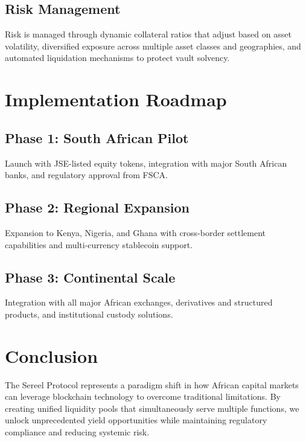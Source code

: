 \documentclass[12pt]{article}
\begin{document}
\subsection{Risk Management}

Risk is managed through dynamic collateral ratios that adjust based on asset volatility, diversified exposure across multiple asset classes and geographies, and automated liquidation mechanisms to protect vault solvency.

\section{Implementation Roadmap}

\subsection{Phase 1: South African Pilot}
Launch with JSE-listed equity tokens, integration with major South African banks, and regulatory approval from FSCA.

\subsection{Phase 2: Regional Expansion}
Expansion to Kenya, Nigeria, and Ghana with cross-border settlement capabilities and multi-currency stablecoin support.

\subsection{Phase 3: Continental Scale}
Integration with all major African exchanges, derivatives and structured products, and institutional custody solutions.

\section{Conclusion}

The Sereel Protocol represents a paradigm shift in how African capital markets can leverage blockchain technology to overcome traditional limitations. By creating unified liquidity pools that simultaneously serve multiple functions, we unlock unprecedented yield opportunities while maintaining regulatory compliance and reducing systemic risk.
\end{document}
